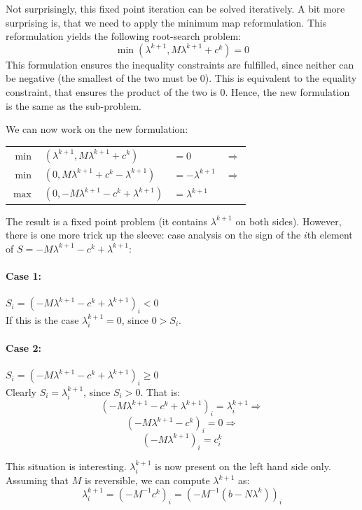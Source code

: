 \documentclass[10pt,oneside,a4paper,final,english]{memoir}
\begin{document}
Not surprisingly, this fixed point iteration can be solved
iteratively. A bit more surprising is, that we need to apply the
minimum map reformulation. This reformulation yields the following
root-search problem:
\[ \min (\lambda^{k+1}, M\lambda^{k+1} + c^k) = 0 \]
This formulation ensures the inequality constraints are fulfilled,
since neither can be negative (the smallest of the two must be
$0$). This is equivalent to the equality constraint, that ensures the
product of the two is $0$. Hence, the new formulation is the same
as the sub-problem.

We can now work on the new formulation:
\begin{center}\begin{tabular}{rlll}
    $ \min $ & $(\lambda^{k+1}, M\lambda^{k+1} + c^k)$&
    $ = 0 $ & $\Rightarrow $ \\

    $ \min $ & $(0, M\lambda^{k+1} + c^k - \lambda^{k+1}) $&
    $= -\lambda^{k+1} $ & $\Rightarrow $ \\

    $ \max $ & $(0, - M\lambda^{k+1} - c^k + \lambda^{k+1}) $&
    $= \lambda^{k+1} $ &
\end{tabular}\end{center}

The result is a fixed point problem (it contains $\lambda^{k+1}$ on
both sides). However, there is one more trick up the sleeve: case
analysis on the sign of the $i$th element of $S = -M\lambda^{k+1} - c^k +
\lambda^{k+1}$:

\paragraph{Case 1: } $S_i = (-M\lambda^{k+1}-c^k+\lambda^{k+1})_i < 0$\\
If this is the case $\lambda^{k+1}_i = 0$, since $0 > S_i$.

\paragraph{Case 2:} $S_i = (-M\lambda^{k+1}-c^k+\lambda^{k+1})_i \geq 0$\\
Clearly $S_i = \lambda^{k+1}_i$, since $S_i > 0$. That is:
\[ (-M\lambda^{k+1}-c^k+\lambda^{k+1})_i = \lambda^{k+1}_i \Rightarrow \]
\[ (-M\lambda^{k+1}-c^k)_i = 0 \Rightarrow \]
\[ (-M\lambda^{k+1})_i = c^k_i \]

This situation is interesting. $\lambda^{k+1}_i$ is now present on the
left hand side only. Assuming that $M$ is reversible, we can compute
$\lambda^{k+1}$ as:
\[ \lambda^{k+1}_i = (-M^{-1}c^k)_i = (-M^{-1}(b - N\lambda^k))_i \]
\end{document}
